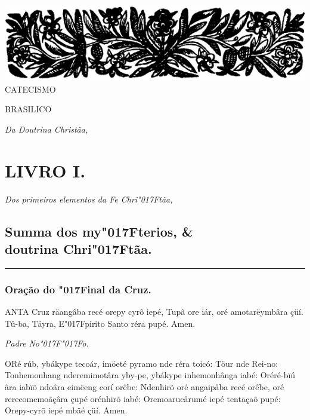 \documentclass[openany,titlepage,12pt]{book}
\renewcommand{\chaptermark}[1]{\markboth{#1}{}}
\renewcommand{\sectionmark}[1]{\gdef\rightmark{#1}}
\newcommand{\lgS}{\char"017F}
\newcommand{\lgSS}{\char"017F\char"017F}
\begin{document}
\begin{center}
    \includegraphics[scale=0.36]{09.livro1.png}
    {\large CATECISMO}
    \vspace{5pt}

    {\huge BRASILICO}

    \textit{Da Doutrina Christãa,}
\end{center}
\unskip
\vspace{-30pt}
{\let\clearpage\relax \chapter{\Huge LIVRO I.}}
\unskip
\vspace{-10pt}

\begin{center}
    \textit{Dos primeiros elementos da Fe Chri\lgS tãa,}
\end{center}
\unskip\vspace{-5pt}
\section{Summa dos my\lgS terios, \& \\doutrina Chri\lgS tãa.}

\chaptermark{Summa}
\sectionmark{Da Doutrina Crhi\lgS tãa.}
\unskip\vspace{-5pt}
\par\noindent\rule{\textwidth}{0.4pt}
\unskip\vspace{5pt}
\subsection{Oração do \lgS inal da Cruz.}

\lettrine[findent =-1pt, nindent=0pt, loversize=-0.1, lraise=0.05, lines=5]
{}{A}NTA Cruz räangâba recé orepy cyrõ iepé, Tupã ore
iár, oré amotarëymbâra çüí. Tû-ba, Täyra, E\lgS pirito Santo
réra pupé. Amen. 
\unskip
\begin{center}
    \unskip
    \textit{Padre No\lgSS o.}
\end{center}
\unskip
\lettrine[findent =4pt, nindent=0pt, lines=2]
{O}{R}é rúb, ybákype tecoár, imöeté pyramo nde réra toicó: Töur
nde Rei-no: Tonhemonhang nderemimotâra yby-pe, ybákype inhemonhânga
iabé: Oréré-\linebreak bïú
 âra iabïõ ndoâra eimëeng corí orêbe: Ndenhirõ
oré angaipâba recé orêbe, oré rerecomemoãçâra çupé orénhirõ iabé:
Oremoarucârumé iepé tentaçaõ pupé: Orepy-cyrõ iepé mbäé çüí. Amen.
\end{document}
